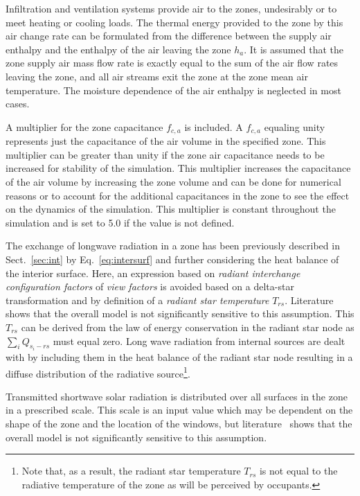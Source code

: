 Infiltration and ventilation systems provide air to the zones, undesirably or to meet heating or cooling loads. The thermal energy provided to the zone by this air change rate can be formulated from the difference between the supply air enthalpy and the enthalpy of the air leaving the zone $h_{a}$. It is assumed that the zone supply air mass flow rate is exactly equal to the sum of the air flow rates leaving the zone, and all air streams exit the zone at the zone mean air temperature. The moisture dependence of the air enthalpy is neglected in most cases.

A multiplier for the zone capacitance $f_{c,a}$ is included. A $f_{c,a}$ equaling unity represents just the capacitance of the air volume in the specified zone. This multiplier can be greater than unity if the zone air capacitance needs to be increased for stability of the simulation. This multiplier increases the capacitance of the air volume by increasing the zone volume and can be done for numerical reasons or to account for the additional capacitances in the zone to see the effect on the dynamics of the simulation. This multiplier is constant throughout the
simulation and is set to 5.0 if the value is not defined. %

 The exchange of longwave radiation in a zone has been previously described in Sect.~\ref{sec:int} by Eq.~\ref{eq:intersurf} and further considering the heat balance of the interior surface. Here, an expression based on \emph{radiant interchange configuration factors} of \emph{view factors} is avoided based on a delta-star transformation and by definition of a \emph{radiant star temperature} $T_{rs}$. Literature~\cite{Liesen1997} shows that the overall model is not significantly sensitive to this assumption. This $T_{rs}$ can be derived from the law of energy conservation in the radiant star node as $\sum_{i}Q_{s_{i}-rs}$ must equal zero. Long wave radiation from internal sources are dealt with by including them in the heat balance of the radiant star node resulting in a diffuse distribution of the radiative source\footnote{Note that, as a result, the radiant star temperature $T_{rs}$ is not equal to the radiative temperature of the zone as will be perceived by occupants.}.

 Transmitted shortwave solar radiation is distributed over all surfaces in the zone in a prescribed scale. This scale is an input value which may be dependent on the shape of the zone and the location of the windows, but literature~\cite{Liesen1997} shows that the overall model is not significantly sensitive to this assumption.

